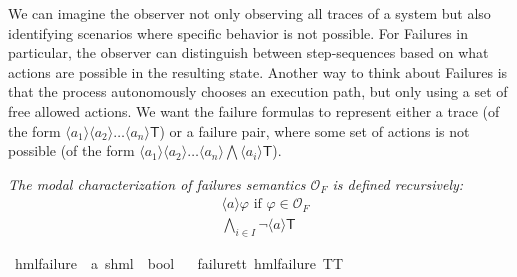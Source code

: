 %
\begin{isabellebody}%
%
%
\isadelimtheory
%
\endisadelimtheory
%
\isatagtheory
%
\endisatagtheory
{\isafoldtheory}%
%
\isadelimtheory
%
\endisadelimtheory
%
\isadelimdocument
%
\endisadelimdocument
%
\isatagdocument
%
\isamarkuptrue%
%
\endisatagdocument
{\isafolddocument}%
%
\isadelimdocument
%
\endisadelimdocument
%
\begin{isamarkuptext}%
We can imagine the observer not only observing all traces of a system but also identifying scenarios where specific behavior is not possible. 
For Failures in particular, the observer can distinguish between step-sequences based on what actions are possible in the resulting state. 
Another way to think about Failures is that the process autonomously chooses an execution path, but only using a set of free allowed actions.
We want the failure formulas to represent either a trace (of the form $\langle a_1 \rangle\langle a_2\rangle\ldots\langle a_n \rangle\textsf{T}$)
or a failure pair, where some set of actions is not possible (of the form $\langle a_1 \rangle\langle a_2\rangle\ldots\langle a_n \rangle\bigwedge \langle a_i\rangle\textsf{T}$).%
\end{isamarkuptext}\isamarkuptrue%
%
\isadelimdocument
%
\endisadelimdocument
%
\isatagdocument
%
\isamarkuptrue%
%
\endisatagdocument
{\isafolddocument}%
%
\isadelimdocument
%
\endisadelimdocument
%
\begin{isamarkuptext}%
\textit{The \textnormal{modal characterization of failures semantics} $\mathcal{O}_F$ is defined recursively:}
\begin{align*}
&\langle a \rangle \varphi \text{ if } \varphi \in \mathcal{O}_F\\
&\bigwedge_{i\in I}\lnot\langle a \rangle \textsf{T}
\end{align*}%
\end{isamarkuptext}\isamarkuptrue%
\isamarkupfalse%
\ hml{\isacharunderscore}{\kern0pt}failure\ {\isacharcolon}{\kern0pt}{\isacharcolon}{\kern0pt}\ {\isachardoublequoteopen}{\isacharparenleft}{\kern0pt}{\isacharprime}{\kern0pt}a{\isacharcomma}{\kern0pt}\ {\isacharprime}{\kern0pt}s{\isacharparenright}{\kern0pt}hml\ {\isasymRightarrow}\ bool{\isachardoublequoteclose}\isanewline
\ \ \isanewline
failure{\isacharunderscore}{\kern0pt}tt{\isacharcolon}{\kern0pt}\ {\isachardoublequoteopen}hml{\isacharunderscore}{\kern0pt}failure\ TT{\isachardoublequoteclose}\ {\isacharbar}{\kern0pt}\isanewline

\end{isabellebody}
